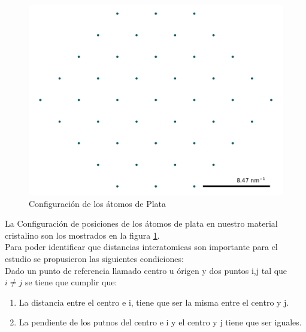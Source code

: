 \documentclass[reprint,amsmath,amssymb,aps,]{revtex4-2}
\begin{document}
\begin{figure}[H]
    \centering
    \includegraphics[scale=0.4]{../Graphics/inicial.png}
    \caption{Configuración de los átomos de Plata}
    \label{fig:inicial}
\end{figure}
La Configuración de posiciones de los átomos de plata en nuestro material cristalino son los mostrados en la figura \ref{fig:inicial}.\\
Para poder identificar que distancias interatomicas son importante para el estudio se propusieron las siguientes condiciones:\\
Dado un punto de referencia llamado centro u órigen y dos puntos i,j tal que $i\neq j$  se tiene que cumplir que:
\begin{enumerate}
    \item La distancia entre el centro e i, tiene que ser la misma entre el centro y j.
    \item La pendiente de los putnos del centro e i y el centro y j tiene que ser iguales.
\end{enumerate}
\end{document}
